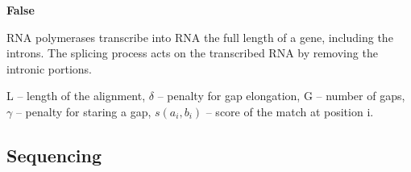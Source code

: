 \begin{Answer} [
   ref={ex21},
   number={21}
 ]

  \Question \textbf{False}

RNA polymerases transcribe into RNA the full length of a gene, including the introns. The splicing process acts on the transcribed RNA by removing the intronic portions.

\end{Answer}

\begin{Answer} [
   ref={ex22},
   number={22}
 ]

  \Question L – length of the alignment, $\delta$ – penalty for gap elongation,
G – number of gaps, $\gamma$ – penalty for staring a gap, $s(a_i, b_i)$ –
score of the match at position i.

\end{Answer}

\subsection{Sequencing}

